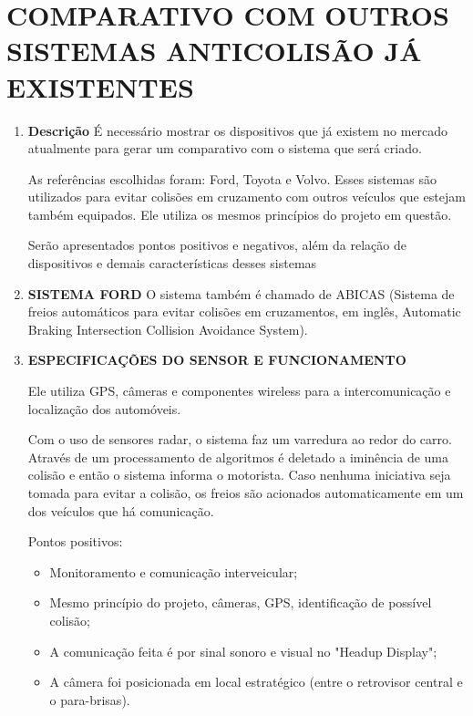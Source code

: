 \chapter[COMPARATIVO COM OUTROS SISTEMAS ANTICOLISÃO JÁ EXISTENTES]{COMPARATIVO COM OUTROS SISTEMAS ANTICOLISÃO JÁ EXISTENTES}
\begin{enumerate}
\item \textbf{Descrição}
É necessário mostrar os dispositivos que já existem no mercado atualmente para
gerar um comparativo com o sistema que será criado.

As referências escolhidas foram:  Ford, Toyota e Volvo. Esses sistemas
são utilizados para evitar colisões em cruzamento com outros  veículos  que
estejam também equipados.  Ele  utiliza  os  mesmos  princípios  do projeto em questão.

Serão apresentados pontos positivos e negativos, além da relação de dispositivos
e demais características desses sistemas

\item \textbf{ SISTEMA FORD}
O sistema também é chamado de ABICAS (Sistema de freios automáticos para evitar
colisões  em  cruzamentos,  em  inglês,   Automatic  Braking  Intersection
 Collision  Avoidance  System).

\item \textbf{ESPECIFICAÇÕES DO SENSOR E FUNCIONAMENTO}

Ele  utiliza  GPS,  câmeras  e  componentes  wireless  para
a  intercomunicação e localização dos automóveis.

Com o uso de sensores radar, o sistema faz um varredura ao
 redor do carro. Através de um processamento de algoritmos é
 deletado a iminência de uma colisão e então o sistema informa
 o motorista. Caso nenhuma iniciativa seja tomada para evitar a
 colisão, os freios são acionados automaticamente em um dos veículos
 que há comunicação.


 Pontos positivos:

 \begin{itemize}
   \item Monitoramento e comunicação interveicular;
   \item Mesmo princípio do projeto, câmeras, GPS, identificação de possível colisão;
   \item A comunicação feita é por sinal sonoro e visual no "Headup Display";
   \item A  câmera  foi  posicionada  em  local  estratégico  (entre  o  retrovisor  central  e  o para-brisas).
 \end{itemize}


\end{enumerate}
